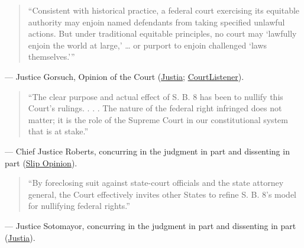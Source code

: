 \documentclass[12pt]{article}
\begin{document}
\begin{quote}
``Consistent with historical practice, a federal court exercising its equitable authority may enjoin named defendants from taking specified unlawful actions. But under traditional equitable principles, no court may `lawfully enjoin the world at large,' \dots{} or purport to enjoin challenged `laws themselves.'''
\end{quote}
\noindent --- Justice Gorsuch, Opinion of the Court (\href{https://supreme.justia.com/cases/federal/us/595/21-463/}{Justia}; \href{https://www.courtlistener.com/opinion/5305640/whole-womans-health-v-jackson/}{CourtListener}).

\begin{quote}
``The clear purpose and actual effect of S. B. 8 has been to nullify this Court's rulings. . . . The nature of the federal right infringed does not matter; it is the role of the Supreme Court in our constitutional system that is at stake.''
\end{quote}
\noindent --- Chief Justice Roberts, concurring in the judgment in part and dissenting in part (\href{https://www.supremecourt.gov/opinions/21pdf/21-463_3ebh.pdf}{Slip Opinion}).

\begin{quote}
``By foreclosing suit against state-court officials and the state attorney general, the Court effectively invites other States to refine S. B. 8's model for nullifying federal rights.''
\end{quote}
\noindent --- Justice Sotomayor, concurring in the judgment in part and dissenting in part (\href{https://supreme.justia.com/cases/federal/us/595/21-463/}{Justia}).
\end{document}
